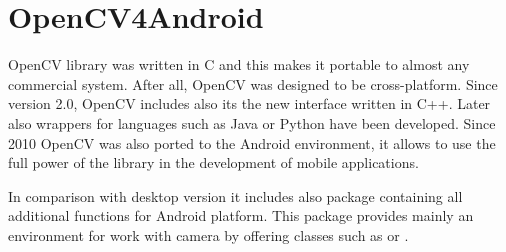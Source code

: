 \section{OpenCV4Android}
OpenCV library was written in C and this makes it portable to almost any commercial system.
After all, OpenCV was designed to be cross-platform.
Since version 2.0, OpenCV includes also its the new interface written in C++. 
Later also wrappers for languages such as Java or Python have been developed. 
Since 2010 OpenCV was also ported to the Android environment, it allows to use the full power of the library in the development of mobile applications.

In comparison with desktop version it includes also  package containing all additional functions for Android platform.
This package provides mainly an environment for work with camera by offering classes such as   or  .

